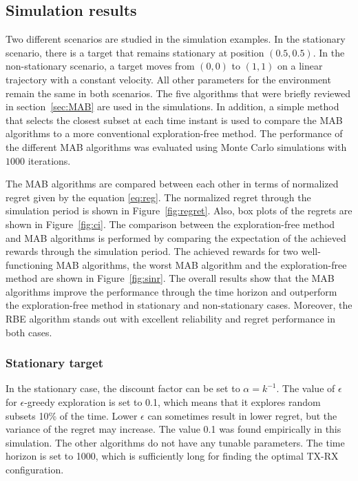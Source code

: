 \documentclass[english, 12pt, a4paper, elec, utf8, a-1b, online]{aaltothesis}
\begin{document}
\subsection{Simulation results}

Two different scenarios are studied in the simulation examples. 
In the stationary scenario, there is a target that remains stationary at position $(0.5, 0.5)$.
In the non-stationary scenario, a target moves from $(0, 0)$ to $(1, 1)$ on a linear trajectory with a constant velocity.
All other parameters for the environment remain the same in both scenarios.
The five algorithms that were briefly reviewed in section~\ref{sec:MAB} are used in the simulations.
In addition, a simple method that selects the closest subset at each time instant is used to compare the MAB algorithms to a more conventional exploration-free method. 
The performance of the different MAB algorithms was evaluated using Monte Carlo simulations with $1000$ iterations.

The MAB algorithms are compared between each other in terms of normalized regret given by the equation \eqref{eq:reg}. 
The normalized regret through the simulation period is shown in Figure~\ref{fig:regret}.
Also, box plots of the regrets are shown in Figure~\ref{fig:ci}.
The comparison between the exploration-free method and MAB algorithms is performed by comparing the expectation of the achieved rewards through the simulation period.
The achieved rewards for two well-functioning MAB algorithms, 
the worst MAB algorithm and the exploration-free method are shown in Figure~\ref{fig:sinr}.
The overall results show that the MAB algorithms improve the performance through the time horizon and outperform the exploration-free method in stationary and non-stationary cases.
Moreover, the RBE algorithm stands out with excellent reliability and regret performance in both cases.

\subsubsection{Stationary target}

In the stationary case, the discount factor can be set to $\alpha=k^{-1}$.
The value of $\epsilon$ for $\epsilon$-greedy exploration is set to 0.1, which means that it explores random subsets 10\% of the time.
Lower $\epsilon$ can sometimes result in lower regret, but the variance of the regret may increase.
The value 0.1 was found empirically in this simulation.
The other algorithms do not have any tunable parameters.
The time horizon is set to 1000, which is sufficiently long for finding the optimal TX-RX configuration.
\end{document}
